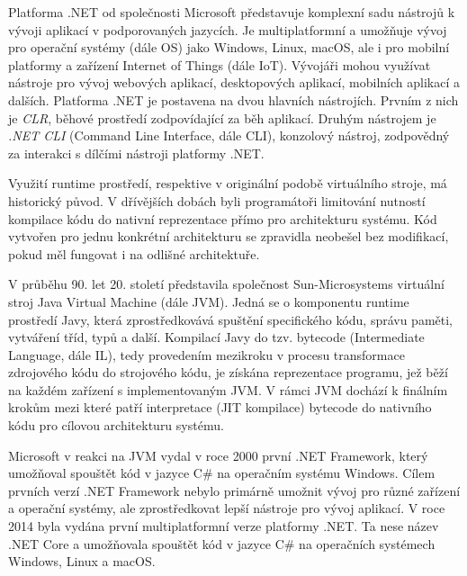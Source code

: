 

Platforma .NET od společnosti Microsoft představuje komplexní sadu nástrojů k vývoji aplikací v podporovaných jazycích. Je multiplatformní a umožňuje vývoj pro operační systémy (dále OS) jako Windows, Linux, macOS, ale i pro mobilní platformy a zařízení Internet of Things (dále IoT). Vývojáři mohou využívat nástroje pro vývoj webových aplikací, desktopových aplikací, mobilních aplikací a dalších. Platforma .NET je postavena na dvou hlavních nástrojích. Prvním z nich je \textit{CLR}, běhové prostředí zodpovídající za běh aplikací. Druhým nástrojem je \textit{.NET CLI} (Command Line Interface, dále CLI), konzolový nástroj, zodpovědný za interakci s dílčími nástroji platformy .NET.


Využití runtime prostředí, respektive v originální podobě virtuálního stroje, má historický původ. V dřívějších dobách byli programátoři limitování nutností kompilace kódu do nativní reprezentace přímo pro architekturu systému. Kód vytvořen pro jednu konkrétní architekturu se zpravidla neobešel bez modifikací, pokud měl fungovat i na odlišné architektuře.

V průběhu 90. let 20. století představila společnost Sun-Microsystems virtuální stroj Java Virtual Machine (dále JVM). Jedná se o komponentu runtime prostředí Javy, která zprostředkovává spuštění specifického kódu, správu paměti, vytváření tříd, typů a další. Kompilací Javy do tzv. bytecode (Intermediate Language, dále IL), tedy provedením mezikroku v procesu transformace zdrojového kódu do strojového kódu, je získána reprezentace programu, jež běží na každém zařízení s implementovaným JVM. V rámci JVM dochází k finálním krokům mezi které patří interpretace (JIT kompilace) bytecode do nativního kódu pro cílovou architekturu systému. 

Microsoft v reakci na JVM vydal v roce 2000 první .NET Framework, který umožňoval spouštět kód v jazyce C\# na operačním systému Windows. Cílem prvních verzí .NET Framework nebylo primárně umožnit vývoj pro různé zařízení a operační systémy, ale zprostředkovat lepší nástroje pro vývoj aplikací. \cite{Troelsen2003} V roce 2014 byla vydána první multiplatformní verze platformy .NET. Ta nese název .NET Core a umožňovala spouštět kód v jazyce C\# na operačních systémech Windows, Linux a macOS. 

